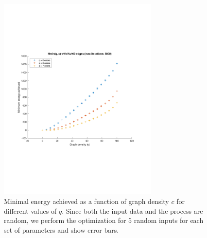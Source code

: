 \documentclass{report}
\begin{document}
  \begin{figure}
    \begin{center}
      \includegraphics[width=8cm]{figures/cost-vs-graph-density.pdf}
    \end{center}
    \label{Fig:cost-vs-density}
    \caption{Minimal energy achieved as a function of graph density $c$ for different values of $q$. Since both the input data and the process are random, we perform the optimization for $5$ random inputs for each set of parameters and show error bars.}
  \end{figure}
\end{document}

